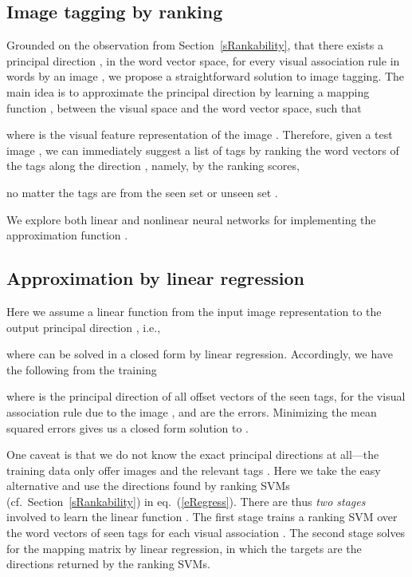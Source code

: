 \documentclass[10pt,twocolumn,letterpaper]{article}
\begin{document}
\subsection{Image tagging by ranking}

Grounded on the observation from Section~\ref{sRankability}, that there exists a principal direction , in the word vector space, for every visual association rule  in words by an image , we propose a straightforward solution to image tagging. The main idea is to  approximate the principal direction by learning a mapping function , between the visual space and the word vector space, such that 

where  is the visual feature representation of the image .  Therefore, given a test image , we can immediately suggest a list of tags by ranking the word vectors of the tags along the direction , namely, by  the ranking scores,

no matter the tags are from the seen set  or unseen set .  

We explore both linear  and nonlinear neural networks for implementing the approximation function .


\subsection{Approximation by linear regression} \label{sLinear}
Here we assume a  linear function from the input image representation  to the output principal direction , i.e., 

where  can be solved in a closed form by linear regression. Accordingly, we have the following from the training 

where  is the principal direction of all offset vectors of the seen tags, for the visual association rule  due to the image , and  are the errors. Minimizing the mean squared errors gives us a closed form solution to . 


One caveat is that we do not  know the exact principal directions  at all---the training data only offer images  and the relevant tags . Here we take the easy alternative and use the directions found by ranking SVMs (cf.\ Section~\ref{sRankability}) in eq.~(\ref{eRegress}). There are thus \emph{two stages} involved to learn the linear function . The first stage trains a ranking SVM over the word vectors of seen tags for each visual association . The second stage solves for the mapping matrix  by linear regression, in which the targets are the directions returned by the ranking SVMs. 
\vspace{-10pt}
\end{document}
